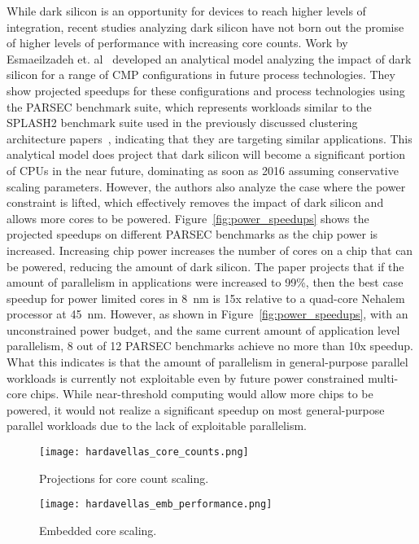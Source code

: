 While dark silicon is an opportunity for devices to reach higher levels of
integration, recent studies analyzing dark silicon have not born out the promise
of higher levels of performance with increasing core counts.  Work by
Esmaeilzadeh et. al~\cite{Esmaeilzadeh2011Dark-silicon-an} developed an
analytical model analyzing the impact of dark silicon for a range of CMP
configurations in future process technologies. They show projected speedups for
these configurations and process technologies using the PARSEC benchmark suite,
which represents workloads similar to the SPLASH2 benchmark suite used in the
previously discussed clustering architecture
papers~\cite{dreslinski2010near,Zhai:2007kn}, indicating that they are targeting
similar applications. This analytical model does project that dark silicon will
become a significant portion of CPUs in the near future, dominating as soon as
2016 assuming conservative scaling parameters. However, the authors also analyze
the case where the power constraint is lifted, which effectively removes the
impact of dark silicon and allows more cores to be powered.
Figure~\ref{fig:power_speedups} shows the projected speedups on different PARSEC
benchmarks as the chip power is increased. Increasing chip power increases the
number of cores on a chip that can be powered, reducing the amount of dark
silicon.  The paper projects that if the amount of parallelism in applications
were increased to 99\%, then the best case speedup for power limited cores in
\SI{8}{\nano\meter} is 15x relative to a quad-core Nehalem processor at
\SI{45}{\nano\meter}. However, as shown in Figure~\ref{fig:power_speedups}, with
an unconstrained power budget, and the same current amount of application level
parallelism, 8 out of 12 PARSEC benchmarks achieve no more than 10x speedup.
What this indicates is that the amount of parallelism in general-purpose
parallel workloads is currently not exploitable even by future power constrained
multi-core chips. While near-threshold computing would allow more chips to be
powered, it would not realize a significant speedup on most general-purpose
parallel workloads due to the lack of exploitable parallelism.

\begin{figure}[thpb]
    \centering
    \texttt{[image: hardavellas\_core\_counts.png]}
    \caption{Projections for core count scaling.~\cite{Hardavellas:2011de}}
    \label{fig:core_counts}
\end{figure}

\begin{figure}[thpb]
    \centering
    \texttt{[image: hardavellas\_emb\_performance.png]}
    \caption{Embedded core scaling.~\cite{Hardavellas:2011de}}
    \label{fig:emb_performance}
\end{figure}

